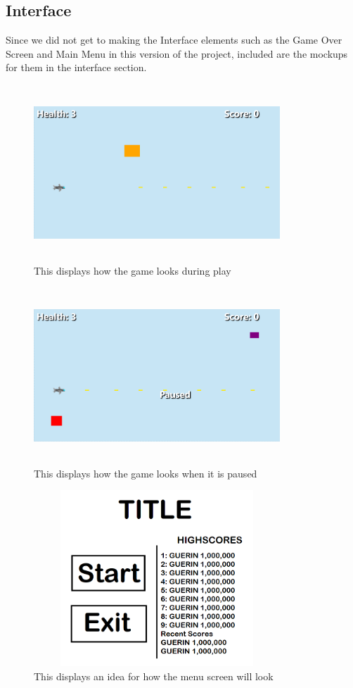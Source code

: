 \documentclass[10pt,conference,onecolumn,compsoc]{IEEEtran}
\begin{document}
\subsection{Interface}
Since we did not get to making the Interface elements such as the Game Over Screen and Main Menu in this version of the project, included are the mockups for them in the interface section.

\begin{figure}[ht!]
\includegraphics[height=250px, width=350px]{GAMEACTION.png}
\caption{This displays how the game looks during play}
\label{gameplay}
\end{figure}

\begin{figure}[ht!]
\includegraphics[height=250px, width=350px]{GAMEPAUSED.png}
\caption{This displays how the game looks when it is paused}
\label{gamepaused}
\end{figure}

\begin{figure}[ht!]
\includegraphics[height=250px, width=350px]{MOCKUP TITLE.png}
\caption{This displays an idea for how the menu screen will look}
\label{mockup}
\end{figure}
\end{document}
